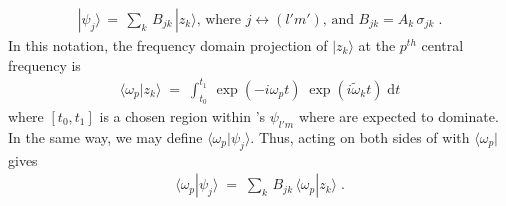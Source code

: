 \documentclass[twocolumn,prd,floatfix,preprintnumbers,a4paper,nofootinbib,superscriptaddress]{revtex4-1}
\newcommand{\cw}{\tilde{\omega}}
\begin{document}
%
\begin{align}
	\label{eq:psij}
	|\psi_j \rangle \, = \, \sum_{k} \, B_{jk} \, | z_k \rangle \text{, where } j \leftrightarrow (l'm') \text{, and } B_{jk} =  A_k \, \sigma_{jk} \; .
\end{align}
%
In this notation, the frequency domain projection of $|z_k\rangle$ at the $p^{th}$ \qnm{} central frequency is
%
\begin{align}
	\label{eq:magic7}
	\langle \omega_p | z_k \rangle \; = \; \int_{t_0}^{t_1} \, \exp{( -i \omega_p t )} \; \exp{( i \cw_k t )} \; \mathrm{d}t
\end{align}
%
where $[t_0,t_1]$ is a chosen region within \nr{}'s $\psi_{l'm}$ where  are expected to dominate.
%
In the same way, we may define $\langle \omega_p | \psi_j \rangle$.
%
Thus, acting on both sides of  with $ \langle \omega_p | $ gives
%
\begin{align}
	\label{eqn:prenormal_form}
	\langle \omega_p | \psi_j \rangle \; = \; \sum_{k} \, B_{jk} \, \langle \omega_p | z_k \rangle \; .
\end{align}
%
\end{document}

